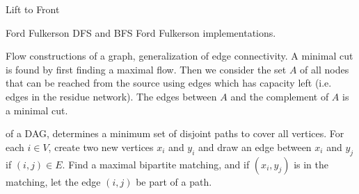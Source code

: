 


\begin{algorithm}{Lift to Front}
\end{algorithm}
\label{liftofront}

\begin{algorithm}{Ford Fulkerson}
\desc
DFS and BFS Ford Fulkerson implementations.
\end{algorithm}

\begin{algorithm}{Flow constructions}
of a graph, generalization of edge connectivity. A minimal cut is
found by first finding a maximal flow. Then we consider the set $A$ of
all nodes that can be reached from the source using edges which has
capacity left (i.e. edges in the residue network). The edges between
$A$ and the complement of $A$ is a minimal cut.

of a DAG, determines a minimum set of disjoint paths to cover all
vertices.  For each $i \in V$, create two new vertices $x_i$ and $y_i$
and draw an edge between $x_i$ and $y_j$ if $(i,j) \in E$.  Find a
maximal bipartite matching, and if $(x_i, y_j)$ is in the matching,
let the edge $(i,j)$ be part of a path.

\end{algorithm}

